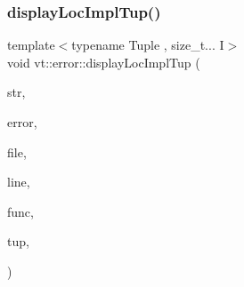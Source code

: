 \mbox{\label{namespacevt_1_1error_a8ba52013f613050350ba268f0efc3074}} 
\subsubsection{\texorpdfstring{display\+Loc\+Impl\+Tup()}{displayLocImplTup()}}
{\footnotesize\ttfamily template$<$typename Tuple , size\+\_\+t... I$>$ \\
void vt\+::error\+::display\+Loc\+Impl\+Tup (\begin{DoxyParamCaption}\item[{std\+::string const \&}]{str,  }\item[{\hyperlink{namespacevt_a793764d753923abc3d32929870beb485}{Error\+Code\+Type}}]{error,  }\item[{std\+::string const \&}]{file,  }\item[{int const}]{line,  }\item[{std\+::string const \&}]{func,  }\item[{Tuple \&\&}]{tup,  }\item[{std\+::index\+\_\+sequence$<$ I... $>$}]{ }\end{DoxyParamCaption})\hspace{0.3cm}{\ttfamily [inline]}}

